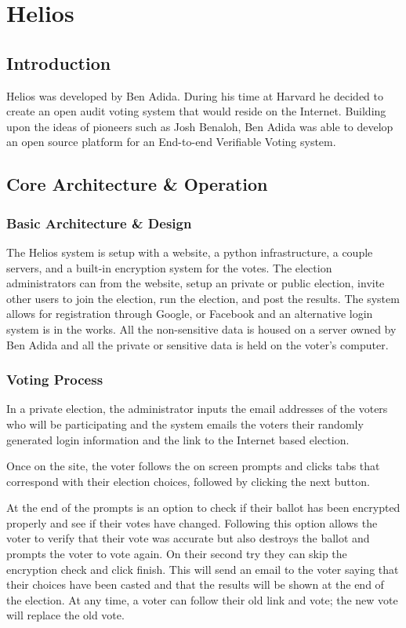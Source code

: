 \section{Helios}

\subsection{Introduction}

Helios was developed by Ben Adida. During his time at Harvard he decided to create an open audit voting system that would reside on the Internet. Building upon the ideas of pioneers such as Josh Benaloh, Ben Adida was able to develop an open source platform for an End-to-end Verifiable Voting system.

\subsection{Core Architecture \& Operation}

\subsubsection{Basic Architecture \& Design}

The Helios system is setup with a website, a python infrastructure, a couple servers, and a built-in encryption system for the votes. The election administrators can from the website, setup an private or public election, invite other users to join the election, run the election, and post the results. The system allows for registration through Google, or Facebook and an alternative login system is in the works. All the non-sensitive data is housed on a server owned by Ben Adida and all the private or sensitive data is held on the voter's computer.

\subsubsection{Voting Process}

In a private election, the administrator inputs the email addresses of the voters who will be participating and the system emails the voters their randomly generated login information and the link to the Internet based election.

Once on the site, the voter follows the on screen prompts and clicks tabs that correspond with their election choices, followed by clicking the next button.

At the end of the prompts is an option to check if their ballot has been encrypted properly and see if their votes have changed. Following this option allows the voter to verify that their vote was accurate but also destroys the ballot and prompts the voter to vote again. On their second try they can skip the encryption check and click finish. This will send an email to the voter saying that their choices have been casted and that the results will be shown at the end of the election. At any time, a voter can follow their old link and vote; the new vote will replace the old vote.

